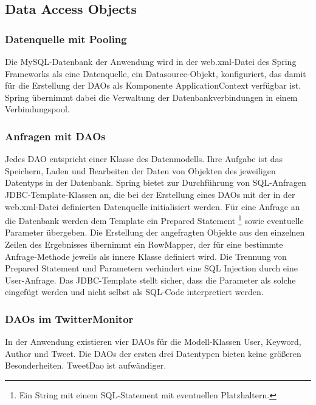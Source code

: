 \subsection{Data Access Objects} 
\subsubsection*{Datenquelle mit Pooling}
Die MySQL-Datenbank der Anwendung wird in der web.xml-Datei des Spring Frameworks als eine 
Datenquelle, ein Datasource-Objekt, konfiguriert, das damit für die Erstellung der DAOs als 
Komponente ApplicationContext verfügbar ist. Spring übernimmt dabei die Verwaltung der 
Datenbankverbindungen in einem Verbindungspool.

\subsubsection*{Anfragen mit DAOs}
Jedes DAO entspricht einer Klasse des Datenmodells. Ihre Aufgabe ist das Speichern, Laden und 
Bearbeiten der Daten von Objekten des jeweiligen Datentyps in der Datenbank. Spring bietet zur 
Durchführung von SQL-Anfragen JDBC-Template-Klassen an, die bei der Erstellung eines DAOs mit der in 
der web.xml-Datei definierten Datenquelle initialisiert werden. Für eine Anfrage an die Datenbank 
werden dem Template ein Prepared Statement \footnote{Ein String mit einem SQL-Statement mit eventuellen Platzhaltern.} sowie eventuelle Parameter übergeben. Die Erstellung der 
angefragten Objekte aus den einzelnen Zeilen des Ergebnisses übernimmt ein RowMapper, der für eine 
bestimmte Anfrage-Methode jeweils als innere Klasse definiert wird. Die Trennung von Prepared 
Statement und Parametern verhindert eine SQL Injection durch eine User-Anfrage. Das JDBC-Template 
stellt sicher, dass die Parameter als solche eingefügt werden und nicht selbst als SQL-Code 
interpretiert werden.

\subsubsection*{DAOs im TwitterMonitor}
In der Anwendung existieren vier DAOs für die Modell-Klassen User, Keyword, Author und Tweet. Die 
DAOs der ersten drei Datentypen bieten keine größeren Besonderheiten. TweetDao ist aufwändiger.

